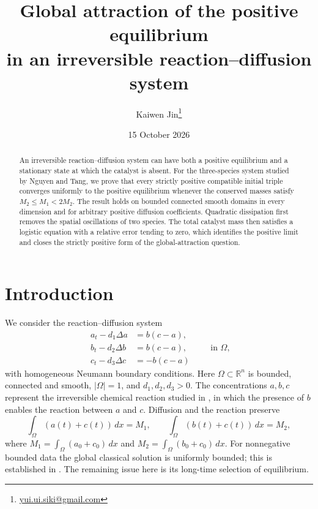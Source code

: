 \documentclass[11pt,a4paper]{article}
\title{Global attraction of the positive equilibrium\\
in an irreversible reaction--diffusion system}
\author{Kaiwen Jin\thanks{\href{mailto:yui.ui.siki@gmail.com}{yui.ui.siki@gmail.com}}}
\date{15 October 2026}
\begin{document}
\maketitle
\begin{abstract}
An irreversible reaction--diffusion system can have both a positive
equilibrium and a stationary state at which the catalyst is absent.
For the three-species system studied by Nguyen and Tang, we prove that
every strictly positive compatible initial triple converges uniformly
to the positive equilibrium whenever the conserved masses satisfy
\(M_2\le M_1<2M_2\). The result holds on bounded connected smooth domains
in every dimension and for arbitrary positive diffusion coefficients.
Quadratic dissipation first removes the spatial oscillations of two
species. The total catalyst mass then satisfies a logistic equation
with a relative error tending to zero, which identifies the positive
limit and closes the strictly positive form of the global-attraction question.
\end{abstract}

\section{Introduction}\label{sec:intro}
We consider the reaction--diffusion system
\begin{equation}\label{eq:system}
 \begin{aligned}
 a_t-d_1\Delta a&=b(c-a),\\
 b_t-d_2\Delta b&=b(c-a),\\
 c_t-d_3\Delta c&=-b(c-a)
 \end{aligned}
 \qquad\text{in }\Omega,
\end{equation}
with homogeneous Neumann boundary conditions. Here \(\Omega\subset\mathbb R^n\)
is bounded, connected and smooth, \(|\Omega|=1\), and \(d_1,d_2,d_3>0\).
The concentrations \(a,b,c\) represent the irreversible chemical reaction
studied in \cite{NT}, in which the presence of \(b\) enables the reaction
between \(a\) and \(c\). Diffusion and the reaction preserve
\begin{equation}\label{eq:masses}
 \int_\Omega(a(t)+c(t))\,dx=M_1,\qquad
 \int_\Omega(b(t)+c(t))\,dx=M_2,
\end{equation}
where \(M_1=\int_\Omega(a_0+c_0)\,dx\) and
\(M_2=\int_\Omega(b_0+c_0)\,dx\).
For nonnegative bounded data the global classical solution is uniformly
bounded; this is established in \cite[Theorem~2.1]{NT}.
The remaining issue here is its long-time selection of equilibrium.
\end{document}
